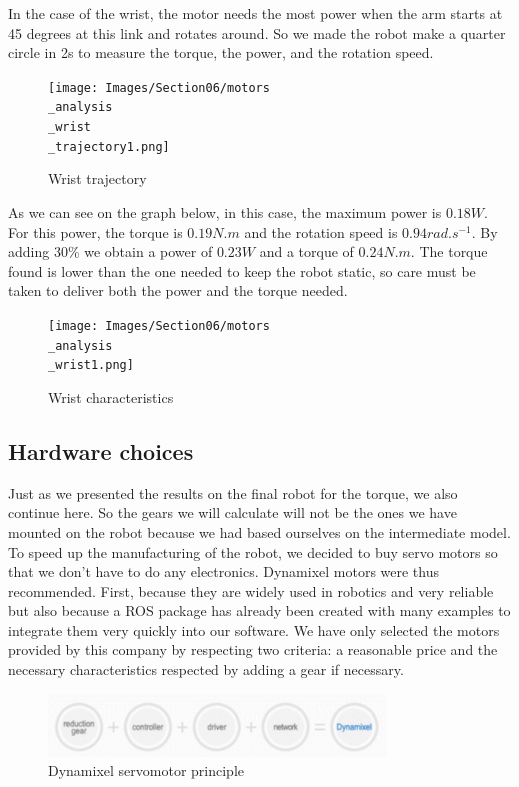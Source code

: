 In the case of the wrist, the motor needs the most power when the arm starts at 45 degrees at this link and rotates around. So we made the robot make a quarter circle in 2s to measure the torque, the power, and the rotation speed.

\begin{figure}[ht]
    \centering
    \texttt{[image: Images/Section06/motors\\\_analysis\\\_wrist\\\_trajectory1.png]}
    \caption{Wrist trajectory}
    \label{fig:WristTrajectory}
\end{figure}
\FloatBarrier

As we can see on the graph below, in this case, the maximum power is $0.18W$. For this power, the torque is $0.19N.m$ and the rotation speed is $0.94rad.s^{-1}$. By adding 30\% we obtain a power of $0.23W$ and a torque of $0.24N.m$. The torque found is lower than the one needed to keep the robot static, so care must be taken to deliver both the power and the torque needed.
\begin{figure}[ht]
    \centering
    \texttt{[image: Images/Section06/motors\\\_analysis\\\_wrist1.png]}
    \caption{Wrist characteristics}
    \label{fig:WristCharacteristics}
\end{figure}
\FloatBarrier

\subsection{Hardware choices}

Just as we presented the results on the final robot for the torque, we also continue here. So the gears we will calculate will not be the ones we have mounted on the robot because we had based ourselves on the intermediate model. To speed up the manufacturing of the robot, we decided to buy servo motors so that we don't have to do any electronics. Dynamixel \cite{Dynamixel} motors were thus recommended. First, because they are widely used in robotics and very reliable but also because a ROS package has already been created with many examples to integrate them very quickly into our software. We have only selected the motors provided by this company by respecting two criteria: a reasonable price and the necessary characteristics respected by adding a gear if necessary.

\begin{figure}[ht]
    \centering
    \includegraphics[width=0.8\textwidth]{Images/Section06/dynamixel.png}
    \caption{Dynamixel servomotor principle}
    \label{fig:DynamixelPrinciple}
\end{figure}
\FloatBarrier

